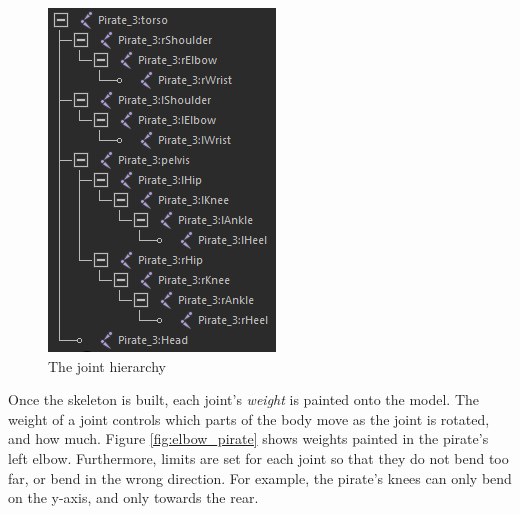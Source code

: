 \begin{figure}
  \begin{center}
    \includegraphics[scale=1]{figures/hierarchy.png}
  \end{center}
  \caption{The joint hierarchy}\label{fig:hierarchy}
\end{figure}

Once the skeleton is built, each joint's \textit{weight} is painted onto the model. The weight of a joint controls which parts of the body move as the joint is rotated, and how much. Figure \ref{fig:elbow_pirate} shows weights painted in the pirate's left elbow. Furthermore, limits are set for each joint so that they do not bend too far, or bend in the wrong direction. For example, the pirate's knees can only bend on the y-axis, and only towards the rear.

